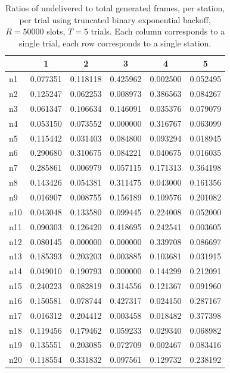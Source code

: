 \documentclass[twocolumn]{article}
\begin{document}
\begin{table}
    \centering 
    \label{fig:fairness_tbeb}
    \begin{tabular}{l|c|c|c|c|c}
           & 1 & 2 & 3 & 4 & 5 \\
        \hline
n1 & 0.077351 & 0.118118 & 0.425962 & 0.002500 & 0.052495 \\
n2 & 0.125247 & 0.062253 & 0.008973 & 0.386563 & 0.084267 \\
n3 & 0.061347 & 0.106634 & 0.146091 & 0.035376 & 0.079079 \\
n4 & 0.053150 & 0.073552 & 0.000000 & 0.316767 & 0.063099 \\
n5 & 0.115442 & 0.031403 & 0.084800 & 0.093294 & 0.018945 \\
n6 & 0.290680 & 0.310675 & 0.084221 & 0.040675 & 0.016035 \\
n7 & 0.285861 & 0.006979 & 0.057115 & 0.171313 & 0.364198 \\
n8 & 0.143426 & 0.054381 & 0.311475 & 0.043000 & 0.161356 \\
n9 & 0.016907 & 0.008755 & 0.156189 & 0.109576 & 0.201082 \\
n10 & 0.043048 & 0.133580 & 0.099445 & 0.224008 & 0.052000 \\
n11 & 0.090303 & 0.126420 & 0.418695 & 0.242541 & 0.003605 \\
n12 & 0.080145 & 0.000000 & 0.000000 & 0.339708 & 0.086697 \\
n13 & 0.185393 & 0.203203 & 0.003885 & 0.103681 & 0.031915 \\
n14 & 0.049010 & 0.190793 & 0.000000 & 0.144299 & 0.212091 \\
n15 & 0.240223 & 0.082819 & 0.314556 & 0.121367 & 0.091960 \\
n16 & 0.150581 & 0.078744 & 0.427317 & 0.024150 & 0.287167 \\
n17 & 0.016312 & 0.204412 & 0.003458 & 0.018482 & 0.377398 \\
n18 & 0.119456 & 0.179462 & 0.059233 & 0.029340 & 0.068982 \\
n19 & 0.135551 & 0.203085 & 0.072709 & 0.002467 & 0.083416 \\
n20 & 0.118554 & 0.331832 & 0.097561 & 0.129732 & 0.238192 
    \end{tabular}
    \caption{ Ratios of undelivered to total generated frames, per station, per trial using
        truncated binary exponential backoff, $R=50000$ slots, $T = 5$ trials.  
        Each column corresponds to a single trial, each row corresponds to a single station. }

\end{table}
\end{document}
